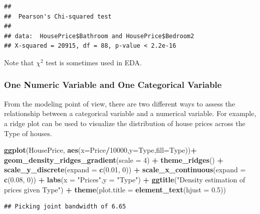 \documentclass[
]{book}
\newenvironment{Shaded}{\begin{snugshade}}{\end{snugshade}}
\newcommand{\AttributeTok}[1]{\textcolor[rgb]{0.13,0.29,0.53}{#1}}
\newcommand{\DecValTok}[1]{\textcolor[rgb]{0.00,0.00,0.81}{#1}}
\newcommand{\FloatTok}[1]{\textcolor[rgb]{0.00,0.00,0.81}{#1}}
\newcommand{\FunctionTok}[1]{\textcolor[rgb]{0.13,0.29,0.53}{\textbf{#1}}}
\newcommand{\NormalTok}[1]{#1}
\newcommand{\SpecialCharTok}[1]{\textcolor[rgb]{0.81,0.36,0.00}{\textbf{#1}}}
\newcommand{\StringTok}[1]{\textcolor[rgb]{0.31,0.60,0.02}{#1}}
\begin{document}
\begin{verbatim}
## 
##  Pearson's Chi-squared test
## 
## data:  HousePrice$Bathroom and HousePrice$Bedroom2
## X-squared = 20915, df = 88, p-value < 2.2e-16
\end{verbatim}

Note that \(\chi^2\) test is sometimes used in EDA.

\hypertarget{one-numeric-variable-and-one-categorical-variable}{%
\subsubsection{One Numeric Variable and One Categorical Variable}\label{one-numeric-variable-and-one-categorical-variable}}

From the modeling point of view, there are two different ways to assess the relationship between a categorical variable and a numerical variable. For example, a ridge plot can be used to visualize the distribution of house prices across the Type of houses.

\begin{Shaded}
\begin{Highlighting}[]
\FunctionTok{ggplot}\NormalTok{(HousePrice, }\FunctionTok{aes}\NormalTok{(}\AttributeTok{x=}\NormalTok{Price}\SpecialCharTok{/}\DecValTok{10000}\NormalTok{,}\AttributeTok{y=}\NormalTok{Type,}\AttributeTok{fill=}\NormalTok{Type))}\SpecialCharTok{+}
  \FunctionTok{geom\_density\_ridges\_gradient}\NormalTok{(}\AttributeTok{scale =} \DecValTok{4}\NormalTok{) }\SpecialCharTok{+} \FunctionTok{theme\_ridges}\NormalTok{() }\SpecialCharTok{+}
  \FunctionTok{scale\_y\_discrete}\NormalTok{(}\AttributeTok{expand =} \FunctionTok{c}\NormalTok{(}\FloatTok{0.01}\NormalTok{, }\DecValTok{0}\NormalTok{)) }\SpecialCharTok{+}
  \FunctionTok{scale\_x\_continuous}\NormalTok{(}\AttributeTok{expand =} \FunctionTok{c}\NormalTok{(}\FloatTok{0.08}\NormalTok{, }\DecValTok{0}\NormalTok{)) }\SpecialCharTok{+}
  \FunctionTok{labs}\NormalTok{(}\AttributeTok{x =} \StringTok{"Prices"}\NormalTok{,}\AttributeTok{y =} \StringTok{"Type"}\NormalTok{) }\SpecialCharTok{+}
  \FunctionTok{ggtitle}\NormalTok{(}\StringTok{"Density estimation of prices given Type"}\NormalTok{) }\SpecialCharTok{+}
  \FunctionTok{theme}\NormalTok{(}\AttributeTok{plot.title =} \FunctionTok{element\_text}\NormalTok{(}\AttributeTok{hjust =} \FloatTok{0.5}\NormalTok{))}
\end{Highlighting}
\end{Shaded}

\begin{verbatim}
## Picking joint bandwidth of 6.65
\end{verbatim}
\end{document}
